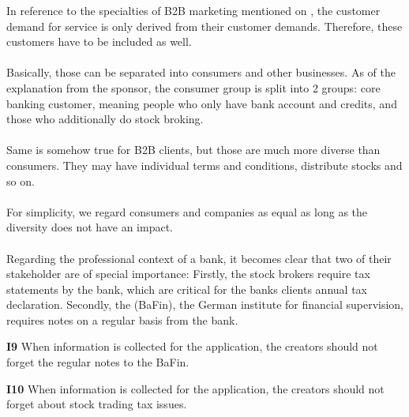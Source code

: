 In reference to the specialties of B2B marketing mentioned on , the customer demand for service is only derived from their customer demands. Therefore, these customers have to be included as well. 

\paragraph{} Basically, those can be separated into consumers and other businesses. As of the explanation from the sponsor, the consumer group is split into 2 groups: core banking customer, meaning people who only have bank account and credits, and those who additionally do stock broking. 

\paragraph{} Same is somehow true for B2B clients, but those are much more diverse than consumers. They may have individual terms and conditions, distribute stocks and so on. 

\paragraph{} For simplicity, we regard consumers and companies as equal as long as the diversity does not have an impact.

\paragraph{}
Regarding the professional context of a bank, it becomes clear that two of their stakeholder are of special importance: Firstly, the stock brokers require tax statements by the bank, which are critical for the banks clients annual tax declaration. Secondly, the  (BaFin), the German institute for financial supervision, requires notes on a regular basis from the bank.

\begin{closeItem}
    \item [\textbf{I9}] When information is collected for the application, the creators should not forget the regular notes to the BaFin.
    \item [\textbf{I10}] When information is collected for the application, the creators should not forget about stock trading tax issues.
\end{closeItem}

